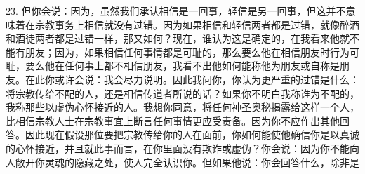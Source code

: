23. 但你会说：因为，虽然我们承认相信是一回事，轻信是另一回事，但这并不意味着在宗教事务上相信就没有过错。因为如果相信和轻信两者都是过错，就像醉酒和酒徒两者都是过错一样，那又如何？现在，谁认为这是确定的，在我看来他就不能有朋友；因为，如果相信任何事情都是可耻的，那么要么他在相信朋友时行为可耻，要么他在任何事上都不相信朋友，我看不出他如何能称他为朋友或自称是朋友。在此你或许会说：我会尽力说明。因此我问你，你认为更严重的过错是什么：将宗教传给不配的人，还是相信传道者所说的话？如果你不明白我称谁为不配的，我称那些以虚伪心怀接近的人。我想你同意，将任何神圣奥秘揭露给这样一个人，比相信宗教人士在宗教事宜上断言任何事情更应受责备。因为你不应作出其他回答。因此现在假设那位要把宗教传给你的人在面前，你如何能使他确信你是以真诚的心怀接近，并且就此事而言，在你里面没有欺诈或虚伪？你会说：因为你不能向人敞开你灵魂的隐藏之处，使人完全认识你。但如果他说：你会回答什么，除非是\par

